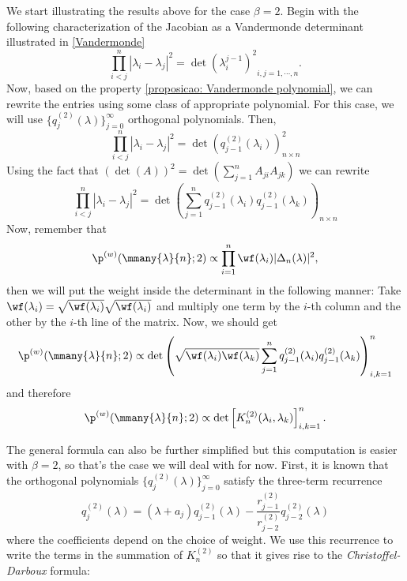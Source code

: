 We start illustrating the results above for the case $\beta=2$. Begin with the following characterization of the Jacobian as a Vandermonde determinant illustrated in \ref{Vandermonde}
\begin{equation}
	\prod_{i<j}^{n} |\lambda_i - \lambda_j|^2 = {\det(\lambda_i^{j-1})^2}_{i,j=1,\cdots,n}.
\end{equation}
Now, based on the property \ref{proposicao: Vandermonde polynomial}, we can rewrite the entries using some class of appropriate polynomial. For this case, we will use $\{q_j^{(2)}(\lambda)\}_{j=0}^\infty$ orthogonal polynomials. Then,
\begin{equation}
	\prod_{i<j}^{n} |\lambda_i - \lambda_j|^2 = {\det\left(q_{j-1}^{(2)}(\lambda_i)\right)}^2_{n\times n}
\end{equation}
Using the fact that $(\det(A))^2 = \det(\sum_{j=1}^{n} A_{ji} A_{jk})$ we can rewrite
\begin{equation}
	\prod_{i<j}^{n} |\lambda_i - \lambda_j|^2 = {\det\left(\sum_{j=1}^{n} q_{j-1}^{(2)}(\lambda_i) q_{j-1}^{(2)}(\lambda_k) \right)}_{n\times n}
\end{equation}
Now, remember that
\begin{equation}
	\p^{(w)}(\mmany{\lambda}{n};2) \propto \prod_{i=1}^{n} \wf(\lambda_i) |\Delta_n(\lambda)|^2,
\end{equation}
then we will put the weight inside the determinant in the following manner: Take $\wf(\lambda_i) = \sqrt{\wf(\lambda_i)}\sqrt{\wf(\lambda_i)}$ and multiply one term by the $i$-th column and the other by the $i$-th line of the matrix. Now, we should get
\begin{equation}
	\p^{(w)}(\mmany{\lambda}{n};2) \propto {\det\left(\sqrt{\wf(\lambda_i)\wf(\lambda_k)} \sum_{j=1}^{n} q_{j-1}^{(2)}(\lambda_i) q_{j-1}^{(2)}(\lambda_k) \right)}_{i,k=1}^{n}
\end{equation}
and therefore
\begin{equation}
	\p^{(w)}(\mmany{\lambda}{n};2) \propto \det\left[ K_n^{(2)}(\lambda_i, \lambda_k) \right]_{i,k=1}^{n}.
\end{equation}

The general formula can also be further simplified but this computation is easier with $\beta = 2$, so that's the case we will deal with for now. First, it is known that the orthogonal polynomials $\{q_j^{(2)}(\lambda)\}_{j=0}^\infty$ satisfy the three-term recurrence
\begin{equation}
	q_{j}^{(2)}(\lambda) = (\lambda + a_j) q_{j-1}^{(2)}(\lambda) - \frac{r_{j-1}^{(2)}}{r_{j-2}^{(2)}} q_{j-2}^{(2)}(\lambda)
\end{equation} 
where the coefficients depend on the choice of weight. We use this recurrence to write the terms in the summation of $K_n^{(2)}$ so that it gives rise to the \textit{Christoffel-Darboux} formula:

